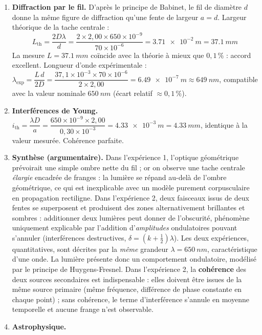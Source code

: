 \documentclass[11pt]{article}
\begin{document}
\begin{corrige}
\begin{enumerate}
    \item \textbf{Diffraction par le fil.} D'après le principe de Babinet, le fil de diamètre $d$ donne la même figure de diffraction qu'une fente de largeur $a = d$. Largeur théorique de la tache centrale :
    \[ L_{\text{th}} = \frac{2D\lambda}{d} = \frac{2 \times 2,00 \times 650\times10^{-9}}{70\times10^{-6}} = \SI{3,71e-2}{m} = \SI{37,1}{mm} \]
    La mesure $L = \SI{37,1}{mm}$ coïncide avec la théorie à mieux que $0,1\,\%$ : accord excellent.
    Longueur d'onde expérimentale : $\lambda_{\text{exp}} = \dfrac{L\,d}{2D} = \dfrac{37,1\times10^{-3} \times 70\times10^{-6}}{2 \times 2,00} = \SI{6,49e-7}{m} \approx \SI{649}{nm}$, compatible avec la valeur nominale $\SI{650}{nm}$ (écart relatif $\approx 0,1\,\%$).
    \item \textbf{Interférences de Young.} $i_{\text{th}} = \dfrac{\lambda D}{a} = \dfrac{650\times10^{-9} \times 2,00}{0,30\times10^{-3}} = \SI{4,33e-3}{m} = \SI{4,33}{mm}$, identique à la valeur mesurée. Cohérence parfaite.
    \item \textbf{Synthèse (argumentaire).} Dans l'expérience 1, l'optique géométrique prévoirait une simple ombre nette du fil ; or on observe une tache centrale \emph{élargie} encadrée de franges : la lumière se répand au-delà de l'ombre géométrique, ce qui est inexplicable avec un modèle purement corpusculaire en propagation rectiligne. Dans l'expérience 2, deux faisceaux issus de deux fentes se superposent et produisent des zones alternativement brillantes et sombres : additionner deux lumières peut donner de l'obscurité, phénomène uniquement explicable par l'addition d'\emph{amplitudes} ondulatoires pouvant s'annuler (interférences destructives, $\delta = (k+\tfrac12)\lambda$). Les deux expériences, quantitatives, sont décrites par la \emph{même} grandeur $\lambda = \SI{650}{nm}$, caractéristique d'une onde. La lumière présente donc un comportement ondulatoire, modélisé par le principe de Huygens-Fresnel. Dans l'expérience 2, la \textbf{cohérence} des deux sources secondaires est indispensable : elles doivent être issues de la même source primaire (même fréquence, différence de phase constante en chaque point) ; sans cohérence, le terme d'interférence s'annule en moyenne temporelle et aucune frange n'est observable.
    \item \textbf{Astrophysique.}
    \begin{enumerate}

\end{enumerate}
\end{enumerate}
\end{corrige}
\end{document}
